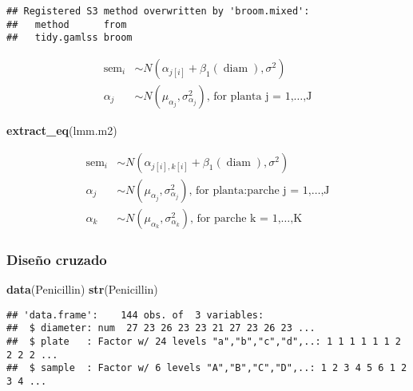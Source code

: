\documentclass[
]{book}
\newenvironment{Shaded}{\begin{snugshade}}{\end{snugshade}}
\newcommand{\KeywordTok}[1]{\textcolor[rgb]{0.13,0.29,0.53}{\textbf{#1}}}
\newcommand{\NormalTok}[1]{#1}
\begin{document}
\begin{verbatim}
## Registered S3 method overwritten by 'broom.mixed':
##   method      from 
##   tidy.gamlss broom
\end{verbatim}

\begin{equation}
\begin{aligned}
  \operatorname{sem}_{i}  &\sim N \left(\alpha_{j[i]} + \beta_{1}(\operatorname{diam}), \sigma^2 \right) \\
    \alpha_{j}  &\sim N \left(\mu_{\alpha_{j}}, \sigma^2_{\alpha_{j}} \right)
    \text{, for planta j = 1,} \dots \text{,J}
\end{aligned}
\end{equation}

\begin{Shaded}
\begin{Highlighting}[]
\KeywordTok{extract_eq}\NormalTok{(lmm.m2)}
\end{Highlighting}
\end{Shaded}

\begin{equation}
\begin{aligned}
  \operatorname{sem}_{i}  &\sim N \left(\alpha_{j[i],k[i]} + \beta_{1}(\operatorname{diam}), \sigma^2 \right) \\
    \alpha_{j}  &\sim N \left(\mu_{\alpha_{j}}, \sigma^2_{\alpha_{j}} \right)
    \text{, for planta:parche j = 1,} \dots \text{,J} \\
    \alpha_{k}  &\sim N \left(\mu_{\alpha_{k}}, \sigma^2_{\alpha_{k}} \right)
    \text{, for parche k = 1,} \dots \text{,K}
\end{aligned}
\end{equation}

\hypertarget{diseuxf1o-cruzado}{%
\subsubsection{Diseño cruzado}\label{diseuxf1o-cruzado}}

\begin{Shaded}
\begin{Highlighting}[]
\KeywordTok{data}\NormalTok{(Penicillin)}
\KeywordTok{str}\NormalTok{(Penicillin)}
\end{Highlighting}
\end{Shaded}

\begin{verbatim}
## 'data.frame':    144 obs. of  3 variables:
##  $ diameter: num  27 23 26 23 23 21 27 23 26 23 ...
##  $ plate   : Factor w/ 24 levels "a","b","c","d",..: 1 1 1 1 1 1 2 2 2 2 ...
##  $ sample  : Factor w/ 6 levels "A","B","C","D",..: 1 2 3 4 5 6 1 2 3 4 ...
\end{verbatim}
\end{document}
